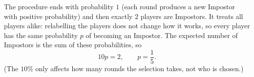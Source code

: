 The procedure ends with probability $1$ (each round produces a new Impostor with positive probability) and then exactly $2$ players are Impostors. It treats all players alike: relabelling the players does not change how it works, so every player has the same probability $p$ of becoming an Impostor. The expected number of Impostors is the sum of these probabilities, so
\[10p=2,\qquad p=\boxed{\dfrac15}.\]
(The $10\%$ only affects how many rounds the selection takes, not who is chosen.)
